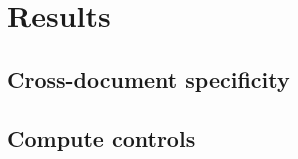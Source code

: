 \section{Results}
\label{sec:results}

\subsection{Cross-document specificity}
\label{sec:results:specificity}

\subsection{Compute controls}
\label{sec:results:controls}
